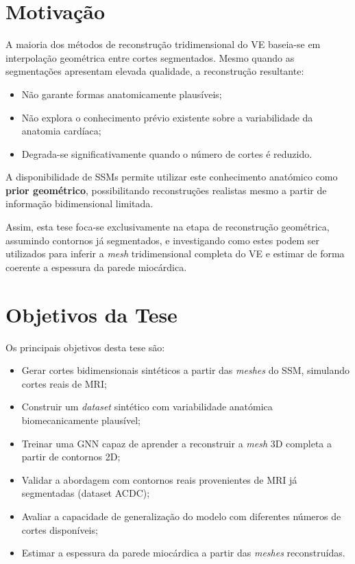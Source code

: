 \documentclass[12pt,a4paper]{report}
\begin{document}
\section{Motivação}

A maioria dos métodos de reconstrução tridimensional do VE baseia-se em interpolação geométrica entre cortes segmentados. Mesmo quando as segmentações apresentam elevada qualidade, a reconstrução resultante:

\begin{itemize}
    \item Não garante formas anatomicamente plausíveis;
    \item Não explora o conhecimento prévio existente sobre a variabilidade da anatomia cardíaca;
    \item Degrada-se significativamente quando o número de cortes é reduzido.
\end{itemize}

A disponibilidade de SSMs permite utilizar este conhecimento anatómico como \textbf{prior geométrico}, possibilitando reconstruções realistas mesmo a partir de informação bidimensional limitada.

Assim, esta tese foca-se exclusivamente na etapa de reconstrução geométrica, assumindo contornos já segmentados, e investigando como estes podem ser utilizados para inferir a \textit{mesh} tridimensional completa do VE e estimar de forma coerente a espessura da parede miocárdica.

\section{Objetivos da Tese}

Os principais objetivos desta tese são:

\begin{itemize}
    \item Gerar cortes bidimensionais sintéticos a partir das \textit{meshes} do SSM, simulando cortes reais de MRI;
    \item Construir um \textit{dataset} sintético com variabilidade anatómica biomecanicamente plausível;
    \item Treinar uma GNN capaz de aprender a reconstruir a \textit{mesh} 3D completa a partir de contornos 2D;
    \item Validar a abordagem com contornos reais provenientes de MRI já segmentadas (dataset ACDC);
    \item Avaliar a capacidade de generalização do modelo com diferentes números de cortes disponíveis;
    \item Estimar a espessura da parede miocárdica a partir das \textit{meshes} reconstruídas.
\end{itemize}
\end{document}
